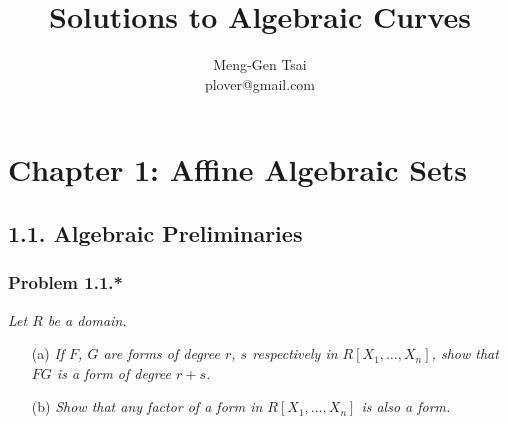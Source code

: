 \documentclass{article}
\title{\textbf{Solutions to Algebraic Curves}}
\author{Meng-Gen Tsai \\ plover@gmail.com}
\begin{document}
\maketitle
\tableofcontents






\newpage
\section*{Chapter 1: Affine Algebraic Sets \\}






\subsection*{1.1. Algebraic Preliminaries \\}



\subsubsection*{Problem 1.1.*}
\emph{Let $R$ be a domain.}
\begin{enumerate}
\item[(a)]
  \emph{If $F$, $G$ are forms of degree $r$, $s$ respectively in $R[X_1,\ldots,X_n]$,
  show that $FG$ is a form of degree $r+s$.}

\item[(b)]
  \emph{Show that any factor of a form in $R[X_1,\ldots,X_n]$ is also a form. } \\
\end{enumerate}
\end{document}
